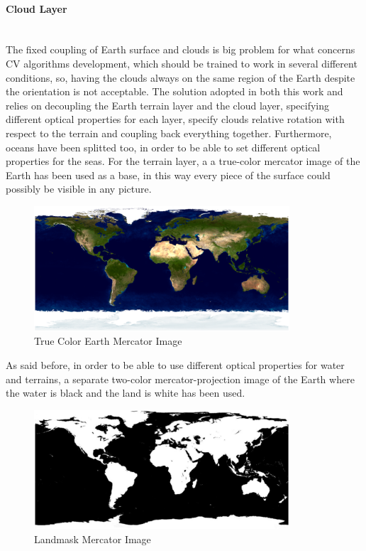 \paragraph{Cloud Layer}\mbox{}\\
The fixed coupling of Earth surface and clouds is big problem for what concerns CV algorithms development, which should be trained to work in several different conditions, so, having the clouds always on the same region of the Earth despite the orientation is not acceptable.
The solution adopted in both this work and \cite{jacopo} relies on decoupling the Earth terrain layer and the cloud layer, specifying different optical properties for each layer, specify clouds relative rotation with respect to the terrain and coupling back everything together.
Furthermore, oceans have been splitted too, in order to be able to set different optical properties for the seas.
For the terrain layer, a a true-color mercator image of the Earth has been used as a base, in this way every piece of the surface could possibly be visible in any picture.

\begin{figure}[htbp]
  \centering
  \includegraphics[width=0.85\textwidth]{gfx/earthMercator.eps}
  \caption{True Color Earth Mercator Image \cite{bluemarble}}
  \label{fig:EarthMercator}
\end{figure}

As said before, in order to be able to use different optical properties for water and terrains, a separate two-color mercator-projection image of the Earth where the water is black and the land is white has been used.

\begin{figure}[htbp]
  \centering
  \includegraphics[width=0.85\textwidth]{gfx/landmask_mercator.eps}
  \caption{Landmask Mercator Image}
  \label{fig:LandmaskMercator}
\end{figure}

